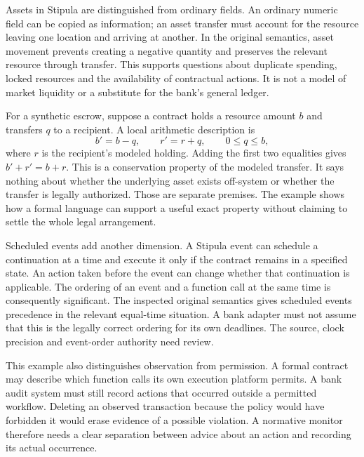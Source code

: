 \documentclass[12pt,a4paper,oneside,openany]{book}
\begin{document}
Assets in Stipula are distinguished from ordinary fields. An ordinary numeric
field can be copied as information; an asset transfer must account for the
resource leaving one location and arriving at another. In the original
semantics, asset movement prevents creating a negative quantity and preserves
the relevant resource through transfer. This supports questions about duplicate
spending, locked resources and the availability of contractual actions. It is
not a model of market liquidity or a substitute for the bank's general ledger.

For a synthetic escrow, suppose a contract holds a resource amount $b$ and
transfers $q$ to a recipient. A local arithmetic description is
\begin{equation}
 b'=b-q,\qquad r'=r+q,\qquad 0\leq q\leq b,
 \label{eq:asset-transfer}
\end{equation}
where $r$ is the recipient's modeled holding. Adding the first two equalities
gives $b'+r'=b+r$. This is a conservation property of the modeled transfer.
It says nothing about whether the underlying asset exists off-system or whether
the transfer is legally authorized. Those are separate premises. The example
shows how a formal language can support a useful exact property without
claiming to settle the whole legal arrangement.

Scheduled events add another dimension. A Stipula event can schedule a
continuation at a time and execute it only if the contract remains in a
specified state. An action taken before the event can change whether that
continuation is applicable. The ordering of an event and a function call at
the same time is consequently significant. The inspected original semantics
gives scheduled events precedence in the relevant equal-time situation. A bank
adapter must not assume that this is the legally correct ordering for its own
deadlines. The source, clock precision and event-order authority need review.

This example also distinguishes observation from permission. A formal contract
may describe which function calls its own execution platform permits. A bank
audit system must still record actions that occurred outside a permitted
workflow. Deleting an observed transaction because the policy would have
forbidden it would erase evidence of a possible violation. A normative monitor
therefore needs a clear separation between advice about an action and recording
its actual occurrence.
\end{document}

